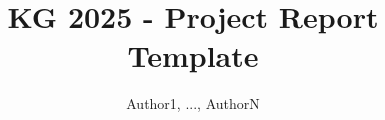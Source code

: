 \documentclass{knowdive}
\title{KG 2025 - Project Report Template}
\author{Author1, ..., AuthorN}
\begin{document}
\maketitle
\begin{sloppypar}
\large
\begin{spacing}{1.05}






%



% 













\end{spacing}
\end{sloppypar}
\end{document}
